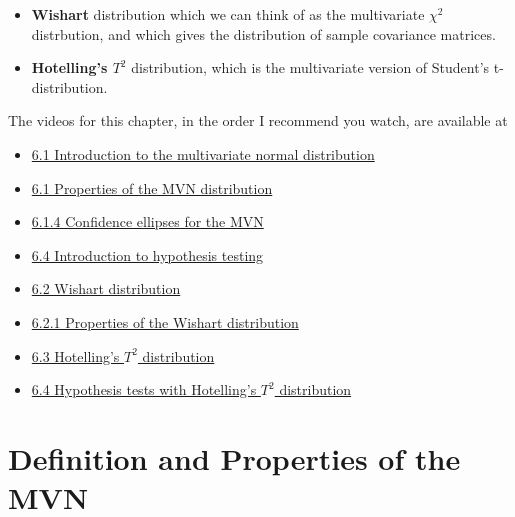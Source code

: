 \documentclass[]{book}
\providecommand{\tightlist}{%
  \setlength{\itemsep}{0pt}\setlength{\parskip}{0pt}}
\theoremstyle{definition}
\theoremstyle{definition}
\theoremstyle{definition}
\theoremstyle{remark}
\begin{document}
\begin{itemize}
\item
  \textbf{Wishart} distribution which we can think of as the multivariate \(\chi^2\) distrbution, and which gives the distribution of sample covariance matrices.
\item
  \textbf{Hotelling's \(T^2\)} distribution, which is the multivariate version of Student's t-distribution.
\end{itemize}

The videos for this chapter, in the order I recommend you watch, are available at

\begin{itemize}
\tightlist
\item
  \href{https://mediaspace.nottingham.ac.uk/media/Multivariate+Normal+Random+VariablesA+Introduction/1_pdjxphay}{6.1 Introduction to the multivariate normal distribution}
\item
  \href{https://mediaspace.nottingham.ac.uk/media/Multivariate+Normal+Random+VariablesA++Properties/1_j9mh4v7r}{6.1 Properties of the MVN distribution}
\item
  \href{https://mediaspace.nottingham.ac.uk/media/Multivariate+Normal+Random+VariablesA++Confidence+Ellipses/1_dlvgqoi3}{6.1.4 Confidence ellipses for the MVN}
\item
  \href{https://mediaspace.nottingham.ac.uk/media/MVN_HypothesistestIntro.mp4/1_b1gstf1h}{6.4 Introduction to hypothesis testing}
\item
  \href{https://mediaspace.nottingham.ac.uk/media/MVN_Wishart/1_3kpedgb6}{6.2 Wishart distribution}
\item
  \href{https://mediaspace.nottingham.ac.uk/media/MVN_WishartProperties/1_yfgzcsyb}{6.2.1 Properties of the Wishart distribution}
\item
  \href{https://mediaspace.nottingham.ac.uk/media/MVN_Hotelling.mp4/1_5evjeyu8}{6.3 Hotelling's \(T^2\) distribution}
\item
  \href{https://mediaspace.nottingham.ac.uk/media/Multivariate+NormalsA+Hypothesis+testing/1_bhk20k5z}{6.4 Hypothesis tests with Hotelling's \(T^2\) distribution}
\end{itemize}

\hypertarget{definition-and-properties-of-the-mvn}{%
\section{Definition and Properties of the MVN}\label{definition-and-properties-of-the-mvn}}
\end{document}
